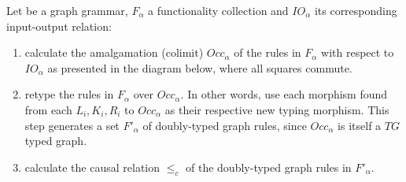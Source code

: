 \begin{definition}\label{def:ogg-construction} Let \graphGrammar{} be a graph grammar, $F_{\alpha}$ a functionality collection and $IO_{\alpha}$ its corresponding input-output relation:

\begin{enumerate}
  \item\label{enum:construction-colimit} calculate the amalgamation (colimit) $Occ_{\alpha}$ of the rules in $F_{\alpha}$ with respect to $IO_{\alpha}$ as presented in the diagram below, where all squares commute.

\hfill\break


\item retype the rules in $F_\alpha$ over $Occ_\alpha$. In other words, use each morphism found from each $L_i, K_i, R_i$ to $Occ_\alpha$ as their respective new typing morphism. This step generates a set $F'_\alpha$ of doubly-typed graph rules, since $Occ_\alpha$ is itself a $TG$ typed graph.

\item calculate the causal relation $\leq_{c}$ of the doubly-typed graph rules in $F'_\alpha$.


\end{enumerate}
\end{definition}
